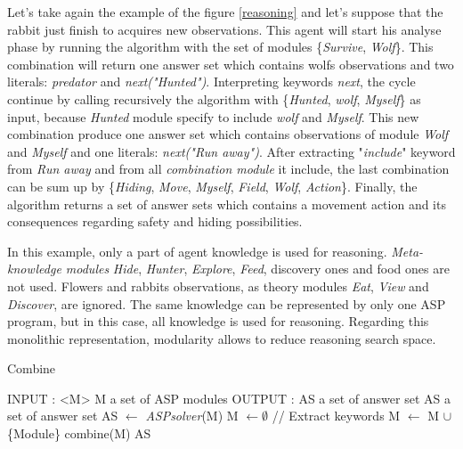 \documentclass{aamas2012}
\begin{document}
	Let's take again the example of the figure \ref{reasoning} and let's suppose that the rabbit just finish to acquires new observations.
	This agent will start his analyse phase by running the algorithm with the set of modules \{\emph{Survive}, \emph{Wolf}\}.
	This combination will return one answer set which contains wolfs observations and two literals: \emph{predator} and \emph{next("Hunted")}.
	Interpreting keywords \emph{next}, the cycle continue by calling recursively the algorithm with \{\emph{Hunted}, \emph{wolf}, \emph{Myself}\} as input, 
	because \emph{Hunted} module specify to include \emph{wolf} and \emph{Myself}.
	This new combination produce one answer set which contains observations of module \emph{Wolf} and \emph{Myself} and one literals: \emph{next("Run away")}.
	After extracting "\emph{include}" keyword from \emph{Run away} and from all \emph{combination module} it include, 
	the last combination can be sum up by \{\emph{Hiding}, \emph{Move}, \emph{Myself}, \emph{Field}, \emph{Wolf}, \emph{Action}\}.
	Finally, the algorithm returns a set of answer sets which contains a movement action and its consequences regarding safety and hiding possibilities.
	
	In this example, only a part of agent knowledge is used for reasoning.
	\emph{Meta-knowledge modules} \emph{Hide}, \emph{Hunter}, \emph{Explore}, \emph{Feed}, discovery ones and food ones are not used.
	Flowers and rabbits observations, as theory modules \emph{Eat}, \emph{View} and \emph{Discover}, are ignored.
	The same knowledge can be represented by only one ASP program, but in this case, all knowledge is used for reasoning.
	Regarding this monolithic representation, modularity allows to reduce reasoning search space.

	\begin{algorithm}
	\caption{Combine}
	\label{framework_algorithm}
	\begin{algorithmic}[1]
	\STATE INPUT : <M> M a set of ASP modules
	\STATE OUTPUT : AS a set of answer set
	\newline
	\STATE AS a set of answer set
	\newline
	\STATE AS $\leftarrow$ \emph{ASPsolver}(M)
	\newline
		\STATE M $\leftarrow \emptyset$ 
		\newline
		\STATE // Extract keywords
				\STATE M $\leftarrow$ M $\cup$ \{Module\}
			\ENDIF
		\ENDFOR
		\newline
			\RETURN combine(M)
		\ENDIF
	\ENDFOR
	\newline
	\RETURN AS
	\end{algorithmic}
	\end{algorithm}
\end{document}
